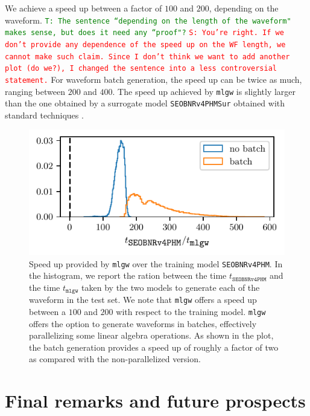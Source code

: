 \documentclass[twocolumn,showpacs,preprintnumbers,nofootinbib,prd,
superscriptaddress,10pt]{revtex4-1}
\newcommand{\stefano}[1]{{\textcolor{red}{\texttt{S: #1}} }}
\newcommand{\tim}[1]{{\textcolor{green}{\texttt{T: #1}} }}
\begin{document}
{We achieve a speed up between a factor of $100$ and $200$, depending on the waveform. \tim{The sentence ``depending on the length of the waveform" makes sense, but does it need any ``proof"?} \stefano{You're right. If we don't provide any dependence of the speed up on the WF length, we cannot make such claim. Since I don't think we want to add another plot (do we?), I changed the sentence into a less controversial statement.}
For waveform batch generation, the speed up can be twice as much, ranging between $200$ and $400$.
The speed up achieved by \texttt{mlgw} is slightly larger than the one obtained by a surrogate model \texttt{SEOBNRv4PHMSur} obtained with standard techniques \cite{Gadre:2022sed}.

\begin{figure}[t]
	\centering
	\includegraphics[scale = 1]{timing}
	\caption{Speed up provided by \texttt{mlgw} over the training model \texttt{SEOBNRv4PHM}.
	In the histogram, we report the ration between the time $t_\texttt{SEOBNRv4PHM}$ and the time $t_\texttt{mlgw}$ taken by the two models to generate each of the waveform in the test set.
	We note that \texttt{mlgw} offers a speed up between a $100$ and $200$ with respect to the training model.
	\texttt{mlgw} offers the option to generate waveforms in batches, effectively parallelizing some linear algebra operations. As shown in the plot, the batch generation provides a speed up of roughly a factor of two as compared with the non-parallelized version.
	}
	\label{fig:timing_hist}
\end{figure}


\section{Final remarks and future prospects}
\label{sec:end}

}
\end{document}
